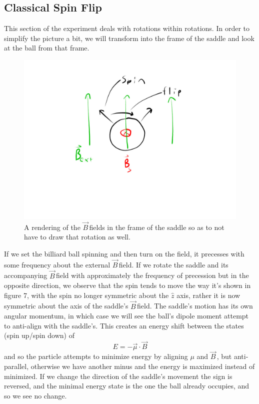 \documentclass{article}
\newcommand{\B}{$\vec{B}\,$}
\begin{document}
	\subsection{Classical Spin Flip}
	This section of the experiment deals with rotations within rotations.  In order to simplify the picture a bit, we will transform into the frame of the saddle and look at the ball from that frame.

	\begin{figure}[!htb]
		\centering
		\includegraphics[scale=.5]{flip.jpg}
		\caption{A rendering of the \B fields in the frame of the saddle so as to not have to draw that rotation as well.}
	\end{figure}

	If we set the billiard ball spinning and then turn on the field, it precesses with some frequency about the external \B field.  If we rotate the saddle and its accompanying \B field with approximately the frequency of precession but in the opposite direction, we observe that the spin tends to move the way it's shown in figure 7, with the spin no longer symmetric about the $\hat{z}$ axis, rather it is now symmetric about the axis of the saddle's \B field.  The saddle's motion has its own angular momentum, in which case we will see the ball's dipole moment attempt to anti-align with the saddle's.  This creates an energy shift between the states (spin up/spin down) of
	\begin{equation*}
		E = -\vec{\mu} \cdot \vec{B}
	\end{equation*}
	and so the particle attempts to minimize energy by aligning $\mu$ and \B, but anti-parallel, otherwise we have another minus and the energy is maximized instead of minimized.  If we change the direction of the saddle's movement the sign is reversed, and the minimal energy state is the one the ball already occupies, and so we see no change.
\end{document}
